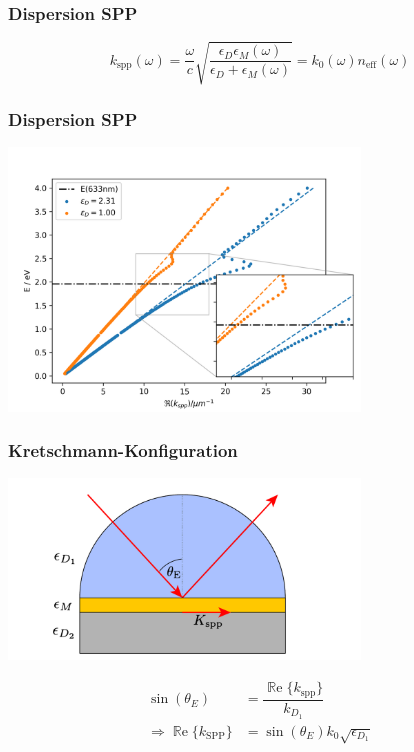 \documentclass[aspectratio=1610]{beamer}
\renewcommand{\Re}{\operatorname{\mathbb{R}e}}
\begin{document}
		\begin{frame}
			\frametitle{Dispersion SPP}
			\begin{equation}
				\boxed{k_{\mathrm{spp}}\left(\omega\right) = \dfrac{\omega}{c} \sqrt{\dfrac{\epsilon_D\epsilon_M(\omega)}{\epsilon_D + 	\epsilon_M(\omega)}}  = k_0(\omega) n_{\mathrm{eff}}(\omega)}
			\end{equation}	
		\end{frame}	
		
		\begin{frame}
		\frametitle{Dispersion SPP}
			\begin{center}
				\includegraphics[width=0.7\textwidth]{figures/dispersion.png}
			\end{center}
		\end{frame}
	
		\begin{frame}
		\frametitle{Kretschmann-Konfiguration}
			\begin{center}
				\includegraphics[width=0.7\textwidth]{figures/Kretschmann.pdf}
			\end{center}
		\begin{align}
			\sin(\theta_E) &= \dfrac{\Re\{k_{\mathrm{spp}}\}}{k_{D_1}}\\
			\Rightarrow \Re\{k_{\mathrm{SPP}}\} &= \sin(\theta_E) k_0 \sqrt{\epsilon_{D_1}}
		\end{align}
		\end{frame}
	
\end{document}
